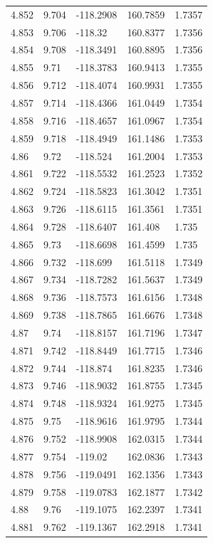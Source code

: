 \begin{tabular}{lllll}
4.852 & 9.704 & -118.2908 & 160.7859 & 1.7357 \\
4.853 & 9.706 & -118.32 & 160.8377 & 1.7356 \\
4.854 & 9.708 & -118.3491 & 160.8895 & 1.7356 \\
4.855 & 9.71 & -118.3783 & 160.9413 & 1.7355 \\
4.856 & 9.712 & -118.4074 & 160.9931 & 1.7355 \\
4.857 & 9.714 & -118.4366 & 161.0449 & 1.7354 \\
4.858 & 9.716 & -118.4657 & 161.0967 & 1.7354 \\
4.859 & 9.718 & -118.4949 & 161.1486 & 1.7353 \\
4.86 & 9.72 & -118.524 & 161.2004 & 1.7353 \\
4.861 & 9.722 & -118.5532 & 161.2523 & 1.7352 \\
4.862 & 9.724 & -118.5823 & 161.3042 & 1.7351 \\
4.863 & 9.726 & -118.6115 & 161.3561 & 1.7351 \\
4.864 & 9.728 & -118.6407 & 161.408 & 1.735 \\
4.865 & 9.73 & -118.6698 & 161.4599 & 1.735 \\
4.866 & 9.732 & -118.699 & 161.5118 & 1.7349 \\
4.867 & 9.734 & -118.7282 & 161.5637 & 1.7349 \\
4.868 & 9.736 & -118.7573 & 161.6156 & 1.7348 \\
4.869 & 9.738 & -118.7865 & 161.6676 & 1.7348 \\
4.87 & 9.74 & -118.8157 & 161.7196 & 1.7347 \\
4.871 & 9.742 & -118.8449 & 161.7715 & 1.7346 \\
4.872 & 9.744 & -118.874 & 161.8235 & 1.7346 \\
4.873 & 9.746 & -118.9032 & 161.8755 & 1.7345 \\
4.874 & 9.748 & -118.9324 & 161.9275 & 1.7345 \\
4.875 & 9.75 & -118.9616 & 161.9795 & 1.7344 \\
4.876 & 9.752 & -118.9908 & 162.0315 & 1.7344 \\
4.877 & 9.754 & -119.02 & 162.0836 & 1.7343 \\
4.878 & 9.756 & -119.0491 & 162.1356 & 1.7343 \\
4.879 & 9.758 & -119.0783 & 162.1877 & 1.7342 \\
4.88 & 9.76 & -119.1075 & 162.2397 & 1.7341 \\
4.881 & 9.762 & -119.1367 & 162.2918 & 1.7341 \\

\end{tabular}

